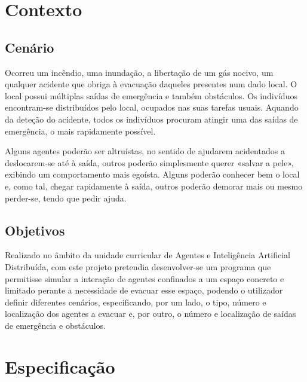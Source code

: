 \documentclass[12pt]{article}
\begin{document}
\begin{titlepage}

\section{Contexto}

\subsection{Cenário}

Ocorreu um incêndio, uma inundação, a libertação de um gás nocivo, um qualquer acidente que obriga à evacuação daqueles presentes num dado local. O local possui múltiplas saídas de emergência e também obstáculos. Os indivíduos encontram-se distribuídos pelo local, ocupados nas suas tarefas usuais. Aquando da deteção do acidente, todos os indivíduos procuram atingir uma das saídas de emergência, o mais rapidamente possível.

Alguns agentes poderão ser altruístas, no sentido de ajudarem acidentados a deslocarem-se até à saída, outros poderão simplesmente querer «salvar a pele», exibindo um comportamento mais egoísta. Alguns poderão conhecer bem o local e, como tal, chegar rapidamente à saída, outros poderão demorar mais ou mesmo perder-se, tendo que pedir ajuda. 


\subsection{Objetivos}

Realizado no âmbito da unidade curricular de Agentes e Inteligência Artificial Distribuída, com este projeto pretendia desenvolver-se um programa que permitisse simular a interação de agentes confinados a um espaço concreto e limitado perante a necessidade de evacuar esse espaço, podendo o utilizador definir diferentes cenários, especificando, por um lado, o tipo, número e localização dos agentes a evacuar e, por outro, o número e localização de saídas de emergência e obstáculos. 


\newpage
\section{Especificação}

\end{titlepage}
\end{document}

